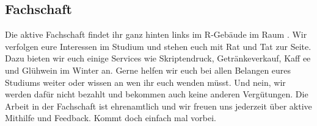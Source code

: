 \subsection{Fachschaft}
Die aktive Fachschaft findet ihr ganz hinten links im R-Gebäude im 
Raum . Wir verfolgen eure Interessen im Studium und stehen 
euch mit Rat und Tat zur Seite. Dazu bieten wir euch einige Services wie 
Skriptendruck, Getränkeverkauf, Kaff ee und Glühwein im Winter an. 
Gerne helfen wir euch bei allen Belangen eures 
Studiums weiter oder wissen an wen ihr euch wenden 
müsst. Und nein, wir werden dafür nicht bezahlt 
und bekommen auch keine anderen Vergütungen. 
Die Arbeit in der Fachschaft ist ehrenamtlich und wir 
freuen uns jederzeit über aktive Mithilfe und Feedback. 
Kommt doch einfach mal vorbei. 






